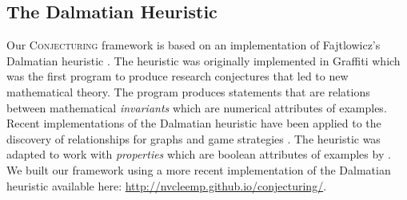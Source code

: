 \documentclass[ijds,nonblindrev]{informs-ijds}
\begin{document}
\subsection{The Dalmatian Heuristic}
\label{dalmatiansec}
Our \textsc{Conjecturing} framework is based on an implementation of Fajtlowicz's Dalmatian heuristic \citep{Fajt95, LarsVanc17}.  The heuristic was originally implemented in {\sc Graffiti} \citep{Fajt95} which was the first program to produce research conjectures that led to new mathematical theory.  The program produces statements that are relations between mathematical {\it invariants} which are numerical attributes of examples.  Recent implementations of the Dalmatian heuristic have been applied to the discovery of relationships for graphs \citep{LarsVanc16} and game strategies \citep{BradEtal17}.  The heuristic was adapted to work with {\it properties} which are boolean attributes of examples by \citet{LarsVanc17}.   We built our framework using a more recent implementation of the Dalmatian heuristic available here: \url{http://nvcleemp.github.io/conjecturing/}.    
%
%
\end{document}
